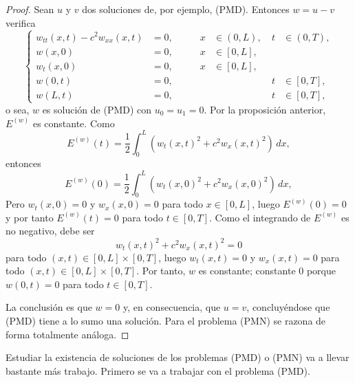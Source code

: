 \documentclass[a4paper, 12pt, extrafontsizes]{memoir}
\begin{document}
\begin{proof}
    Sean $u$ y $v$ dos soluciones de, por ejemplo, (PMD). Entonces $w = u-v$ verifica
    \[
         \left\{\begin{alignedat}{5}
            w_{tt}(x,t)-c^2w_{xx}(x,t) &= 0, \qquad & x &\in (0,L), \ & t &\in (0,T), \\
            w(x,0) &= 0, \qquad & x &\in [0,L], & & \\
            w_t(x,0) &= 0, \qquad & x &\in [0,L], & & \\
            w(0,t) &= 0, \qquad & & & t &\in [0,T], \\
            w(L,t) &= 0, \qquad & & & t &\in [0,T],
        \end{alignedat}\right.
    \]
    o sea, $w$ es solución de (PMD) con $u_0 = u_1 = 0$. Por la proposición anterior, $E^{(w)}$ es constante. Como
    \[E^{(w)}(t) = \frac{1}{2}\int_0^L(w_t(x,t)^2+c^2w_x(x,t)^2) \, dx,\]
    entonces
    \[E^{(w)}(0) = \frac{1}{2}\int_0^L(w_t(x,0)^2+c^2w_x(x,0)^2) \, dx,\]
    Pero $w_t(x,0) = 0$ y $w_x(x,0) = 0$ para todo $x \in [0,L]$, luego $E^{(w)}(0) = 0$ y por tanto $E^{(w)}(t) = 0$ para todo $t \in [0,T]$. Como el integrando de $E^{(w)}$ es no negativo, debe ser
    \[w_t(x,t)^2+c^2w_x(x,t)^2 = 0\]
    para todo $(x,t) \in [0,L] \times [0,T]$, luego $w_t(x,t) = 0$ y $w_x(x,t) = 0$ para todo $(x,t) \in [0,L] \times [0,T]$. Por tanto, $w$ es constante; constante 0 porque $w(0,t) = 0$ para todo $t \in [0,T]$.

    La conclusión es que $w = 0$ y, en consecuencia, que $u = v$, concluyéndose que (PMD) tiene a lo sumo una solución. Para el problema (PMN) se razona de forma totalmente análoga.
\end{proof}

Estudiar la existencia de soluciones de los problemas (PMD) o (PMN) va a llevar bastante más trabajo. Primero se va a trabajar con el problema (PMD).
\end{document}
